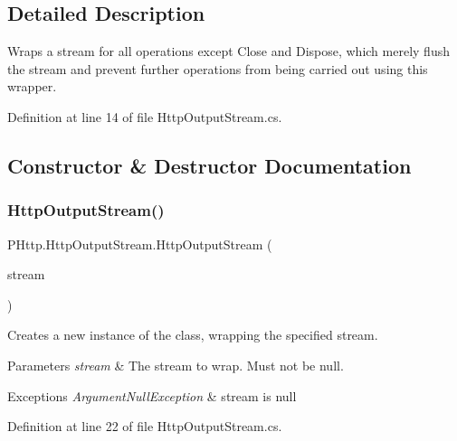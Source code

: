\subsection{Detailed Description}
Wraps a stream for all operations except Close and Dispose, which merely flush the stream and prevent further operations from being carried out using this wrapper. 



Definition at line 14 of file Http\+Output\+Stream.\+cs.



\subsection{Constructor \& Destructor Documentation}
\mbox{\label{class_p_http_1_1_http_output_stream_af724a23a088e6cb05f4fe5fbe324c839}} 
\subsubsection{\texorpdfstring{Http\+Output\+Stream()}{HttpOutputStream()}}
{\footnotesize\ttfamily P\+Http.\+Http\+Output\+Stream.\+Http\+Output\+Stream (\begin{DoxyParamCaption}\item[{Memory\+Stream}]{stream }\end{DoxyParamCaption})}



Creates a new instance of the class, wrapping the specified stream. 


\begin{DoxyParams}{Parameters}
{\em stream} & The stream to wrap. Must not be null.\\
\hline
\end{DoxyParams}

\begin{DoxyExceptions}{Exceptions}
{\em Argument\+Null\+Exception} & stream is null\\
\hline
\end{DoxyExceptions}


Definition at line 22 of file Http\+Output\+Stream.\+cs.




